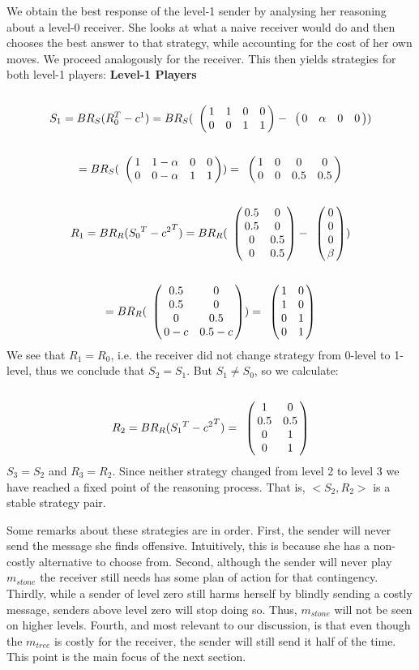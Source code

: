 \documentclass[10pt]{article}
\begin{document}
We obtain the best response of the level-1 sender by analysing her reasoning about a level-0 receiver. She looks at what a naive receiver would do and then chooses the best answer to that strategy, while accounting for the cost of her own moves. We proceed analogously for the receiver. This then yields strategies for both level-1 players:
\textbf{Level-1 Players}\\
\begin{equation*}
S_1= BR_S(R^T_0-c^1)=
BR_S(
\bordermatrix{
            & & & &    \cr
 &       1 &         1 & 0       & 0 \cr
 &       0 &         0 & 1      & 1
 }
-
\bordermatrix{
            & & & &    \cr
 &       0 &         \alpha & 0       & 0 \cr
 }
)
\end{equation*}
\begin{equation*}
=BR_S(
\bordermatrix{
                & & & &    \cr
     &       1 &         1-\alpha & 0       & 0 \cr
     &       0 &         0-\alpha & 1      & 1
 }
 )
=
\bordermatrix{
                 & & & &    \cr
      &       1 &         0 & 0       & 0 \cr
      &       0 &         0 & 0.5      & 0.5
  }
\end{equation*}
\begin{equation*}
R_1=BR_R({S_0}^T-{c^2}^T)=
BR_R(
\bordermatrix{
            &  & \cr
    & 0.5 & 0 \cr
     & 0.5 & 0 \cr
     & 0 & 0.5 \cr
     & 0 & 0.5 \cr
 }
-
\bordermatrix{
  & \cr
    & 0 \cr
     & 0 \cr
     & 0 \cr
     & \beta \cr
 }
)
\end{equation*}
\begin{equation*}
=
BR_R(
\bordermatrix{
            &  & \cr
    & 0.5 & 0 \cr
     & 0.5 & 0 \cr
     & 0 & 0.5 \cr
     & 0-c & 0.5-c \cr
 }
 )
=
\bordermatrix{
            &  & \cr
    & 1 & 0 \cr
     & 1 & 0 \cr
     & 0 & 1 \cr
     & 0 & 1 \cr
 }
\end{equation*}
We see that $R_1=R_0$, i.e. the receiver did not change strategy from 0-level to 1-level, thus we conclude that $S_2=S_1$. But $S_1 \neq S_0$, so we calculate:
\begin{equation*}
R_2=BR_R({S_1}^T-{c^2}^T)=
\bordermatrix{
            &  & \cr
    & 1 & 0 \cr
     & 0.5 & 0.5 \cr
     & 0 & 1 \cr
     & 0 & 1 \cr
 }
\end{equation*}
$S_3=S_2$ and $R_3=R_2$. Since neither strategy changed from level 2 to level 3 we have reached a fixed point of the reasoning process. That is,  $<S_2,R_2>$ is a stable strategy pair.

Some remarks about these strategies are in order. First, the sender will never send the message she finds offensive. Intuitively, this is because she has a non-costly alternative to choose from. Second, although the sender will never play $m_{stone}$ the receiver still needs has some plan of action for that contingency. Thirdly, while a sender of level zero still harms herself by blindly sending a costly message, senders above level zero will stop doing so. Thus, $m_{stone}$ will not be seen on higher levels. Fourth, and most relevant to our discussion, is that even though the $m_{tree}$ is costly for the receiver, the sender will still send it half of the time. This point is the main focus of the next section.
\end{document}
